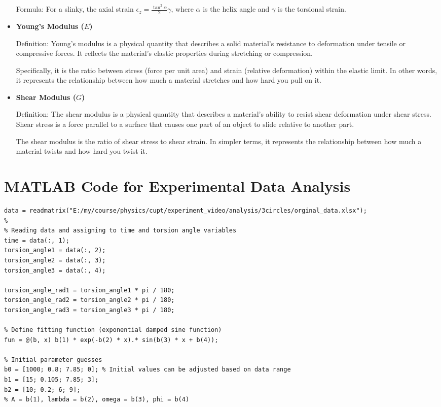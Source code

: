 \documentclass{mcmthesis}  %
\begin{document}
\begin{appendices}
\begin{itemize}
    Formula: For a slinky, the axial strain $\epsilon_z = \frac{\tan^2 \alpha}{2}\gamma$, where $\alpha$ is the helix angle and $\gamma$ is the torsional strain.

    \item \textbf{Young's Modulus ($E$)}
    
    Definition: Young's modulus is a physical quantity that describes a solid material's resistance to deformation under tensile or compressive forces. It reflects the material's elastic properties during stretching or compression.
    
    Specifically, it is the ratio between stress (force per unit area) and strain (relative deformation) within the elastic limit. In other words, it represents the relationship between how much a material stretches and how hard you pull on it.

    \item \textbf{Shear Modulus ($G$)}
    
    Definition: The shear modulus is a physical quantity that describes a material's ability to resist shear deformation under shear stress. Shear stress is a force parallel to a surface that causes one part of an object to slide relative to another part.
    
    The shear modulus is the ratio of shear stress to shear strain. In simpler terms, it represents the relationship between how much a material twists and how hard you twist it.
\end{itemize}

\section{MATLAB Code for Experimental Data Analysis}  %

\begin{verbatim}
data = readmatrix("E:/my/course/physics/cupt/experiment_video/analysis/3circles/orginal_data.xlsx");
% 
% Reading data and assigning to time and torsion angle variables
time = data(:, 1);
torsion_angle1 = data(:, 2);
torsion_angle2 = data(:, 3);
torsion_angle3 = data(:, 4);

torsion_angle_rad1 = torsion_angle1 * pi / 180;
torsion_angle_rad2 = torsion_angle2 * pi / 180;
torsion_angle_rad3 = torsion_angle3 * pi / 180;

% Define fitting function (exponential damped sine function)
fun = @(b, x) b(1) * exp(-b(2) * x).* sin(b(3) * x + b(4));

% Initial parameter guesses
b0 = [1000; 0.8; 7.85; 0]; % Initial values can be adjusted based on data range
b1 = [15; 0.105; 7.85; 3];
b2 = [10; 0.2; 6; 9];
% A = b(1), lambda = b(2), omega = b(3), phi = b(4)


\end{verbatim}
\end{appendices}
\end{document}
